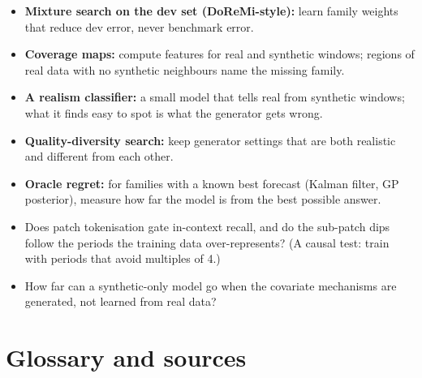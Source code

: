 \documentclass[10pt,a4paper]{article}
\begin{document}
\begin{explore}
\begin{itemize}
\item \textbf{Mixture search on the dev set (DoReMi-style):} learn family weights that reduce dev error, never benchmark error.
\item \textbf{Coverage maps:} compute features for real and synthetic windows; regions of real data with no synthetic neighbours name the missing family.
\item \textbf{A realism classifier:} a small model that tells real from synthetic windows; what it finds easy to spot is what the generator gets wrong.
\item \textbf{Quality-diversity search:} keep generator settings that are both realistic and different from each other.
\item \textbf{Oracle regret:} for families with a known best forecast (Kalman filter, GP posterior), measure how far the model is from the best possible answer.
\end{itemize}
\end{explore}

\begin{explore}
\begin{itemize}
\item Does patch tokenisation gate in-context recall, and do the sub-patch dips follow the periods the training data over-represents? (A causal test: train with periods that avoid multiples of 4.)
\item How far can a synthetic-only model go when the covariate mechanisms are generated, not learned from real data?
\end{itemize}
\end{explore}

\appendix
\section{Glossary and sources}
\end{document}
